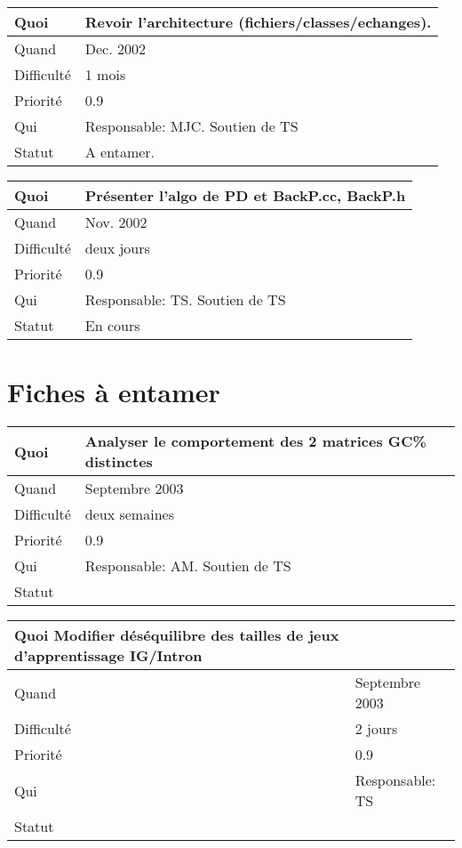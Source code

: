 \documentclass[a4paper,11pt]{article}
\begin{document}
\begin{longtable}{|l|p{7cm}|}\hline
  Quoi & Revoir l'architecture (fichiers/classes/echanges).\\\hline
  Quand  &  Dec. 2002\\\hline
  Difficult\'e &  1 mois\\\hline
  Priorit\'e &  0.9 \\\hline
  Qui & Responsable: MJC. Soutien de TS\\\hline
  Statut & A entamer. \\\hline
\end{longtable}

\begin{longtable}{|l|p{7cm}|}\hline
  Quoi & Pr{\'e}senter l'algo de PD et BackP.cc, BackP.h \\\hline
  Quand  &  Nov. 2002\\\hline
  Difficult\'e & deux jours  \\\hline
  Priorit\'e &  0.9\\\hline
  Qui & Responsable: TS. Soutien de TS\\\hline
  Statut & En cours\\\hline
\end{longtable}


\section{Fiches \`a entamer}

\begin{longtable}{|l|p{7cm}|}\hline
  Quoi & Analyser le comportement des 2 matrices GC\% distinctes\\\hline
  Quand  &  Septembre 2003 \\\hline
  Difficult\'e & deux semaines \\\hline
  Priorit\'e &  0.9\\\hline
  Qui & Responsable: AM. Soutien de TS\\\hline
  Statut & \\\hline
\end{longtable}

\begin{longtable}{|l|p{7cm}|}\hline
  Quoi Modifier d\'es\'equilibre des tailles de jeux d'apprentissage IG/Intron& \\\hline
  Quand  &  Septembre 2003\\\hline
  Difficult\'e & 2 jours \\\hline
  Priorit\'e &  0.9 \\\hline
  Qui & Responsable: TS\\\hline
  Statut & \\\hline
\end{longtable}
\end{document}
